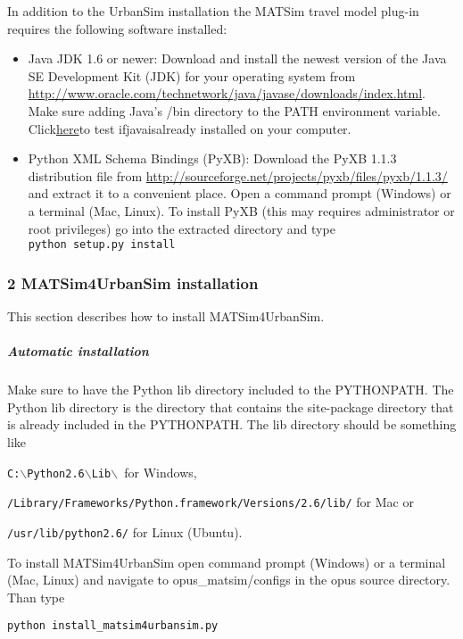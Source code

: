 \documentclass[a4paper,11pt]{report}
\begin{document}
In addition to the UrbanSim installation the MATSim travel model plug-in requires the following software installed:
\begin{itemize}
	\item Java JDK 1.6 or newer: Download and install the newest version  of the Java SE Development Kit (JDK) for your operating system from \href{http://www.oracle.com/technetwork/java/javase/downloads/index.html}{http://www.oracle.com/technetwork/java/javase/downloads/index.html}. Make sure adding Java's /bin directory to the PATH environment variable. Click\href{http://java.com/en/download/testjava.jsp}{here}to test ifjavaisalready installed on your computer.
	\item Python XML Schema Bindings (PyXB): Download the PyXB 1.1.3 distribution file from \href{http://sourceforge.net/projects/pyxb/files/pyxb/1.1.3/}{http://sourceforge.net/projects/pyxb/files/pyxb/1.1.3/}  and extract it to a convenient place. Open a command prompt (Windows)  or a terminal (Mac, Linux). To install PyXB (this may requires  administrator or root privileges) go into the extracted directory and  type
\\


\texttt{python setup.py install}
\end{itemize}

\subsubsection{2 MATSim4UrbanSim installation}

This section describes how to install MATSim4UrbanSim.

\subparagraph{Automatic installation}

Make sure to have the Python lib directory included to the  PYTHONPATH. The Python lib directory is the directory that contains the  site-package directory that is already included in the PYTHONPATH. The  lib directory should be something like


\texttt{C:$\backslash$Python2.6$\backslash$Lib$\backslash$ }for Windows,


\texttt{/Library/Frameworks/Python.framework/Versions/2.6/lib/} for Mac or


\texttt{/usr/lib/python2.6/} for Linux (Ubuntu).

To install MATSim4UrbanSim open command prompt (Windows) or a  terminal (Mac, Linux) and navigate to opus\_matsim/configs in the opus  source directory. Than type


\texttt{python install\_matsim4urbansim.py}
\end{document}
